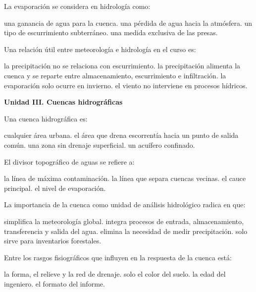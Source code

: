 \question [3] La evaporación se considera en hidrología como:
\begin{choices}
\choice una ganancia de agua para la cuenca.
\CorrectChoice una pérdida de agua hacia la atmósfera.
\choice un tipo de escurrimiento subterráneo.
\choice una medida exclusiva de las presas.
\end{choices}


\question [3] Una relación útil entre meteorología e hidrología en el curso es:
\begin{choices}
\choice la precipitación no se relaciona con escurrimiento.
\CorrectChoice la precipitación alimenta la cuenca y se reparte entre almacenamiento, escurrimiento e infiltración.
\choice la evaporación solo ocurre en invierno.
\choice el viento no interviene en procesos hídricos.
\end{choices}

\item[]\textbf{Unidad III. Cuencas hidrográficas}\par\medskip

\question [3] Una cuenca hidrográfica es:
\begin{choices}
\choice cualquier área urbana.
\CorrectChoice el área que drena escorrentía hacia un punto de salida común.
\choice una zona sin drenaje superficial.
\choice un acuífero confinado.
\end{choices}

\question [3] El divisor topográfico de aguas se refiere a:
\begin{choices}
\choice la línea de máxima contaminación.
\CorrectChoice la línea que separa cuencas vecinas.
\choice el cauce principal.
\choice el nivel de evaporación.
\end{choices}

\question [3] La importancia de la cuenca como unidad de análisis hidrológico radica en que:
\begin{choices}
\choice simplifica la meteorología global.
\CorrectChoice integra procesos de entrada, almacenamiento, transferencia y salida del agua.
\choice elimina la necesidad de medir precipitación.
\choice solo sirve para inventarios forestales.
\end{choices}

\question [3] Entre los rasgos fisiográficos que influyen en la respuesta de la cuenca está:
\begin{choices}
\choice la forma, el relieve y la red de drenaje.
\choice solo el color del suelo.
\choice la edad del ingeniero.
\choice el formato del informe.
\end{choices}

